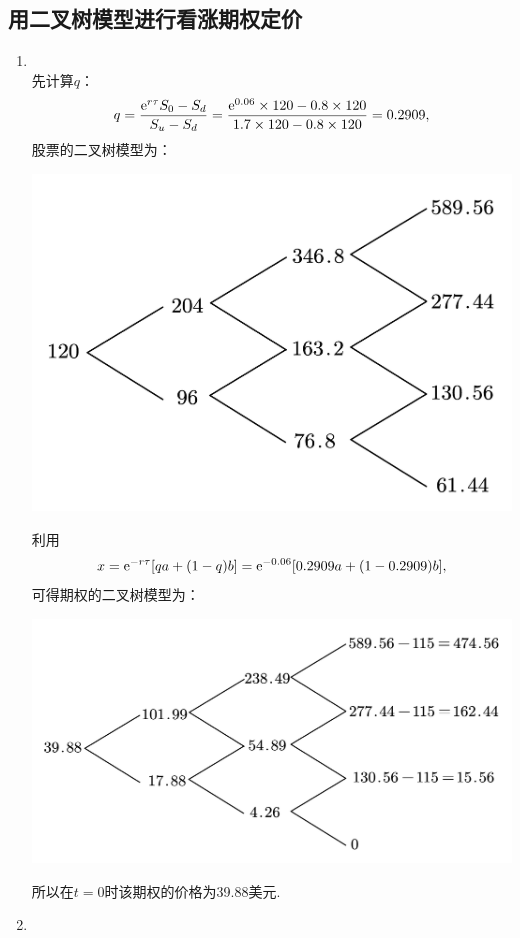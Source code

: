 \subsection{用二叉树模型进行看涨期权定价}
\begin{enumerate}
    \item \sol\\
    先计算$q$：
    \[q = \frac{\mathrm{e}^{r\tau}S_0 - S_d}{S_u - S_d} = \frac{\mathrm{e}^{0.06}\times 120-0.8\times120}{1.7\times120-0.8\times120}=0.2909,\]
    股票的二叉树模型为：
    \begin{center}
        \includegraphics[scale=0.35]{CH3-2-1-股票.pdf}
    \end{center}
    利用
    \[x = \mathrm{e}^{-r\tau}[qa+(1-q)b]=\mathrm{e}^{-0.06}[0.2909a+(1-0.2909)b],\]
    可得期权的二叉树模型为：
    \begin{center}
        \includegraphics[scale=0.35]{CH3-2-1-期权.pdf}
    \end{center}
    所以在$t=0$时该期权的价格为39.88美元.
    \item \sol\\

\end{enumerate}

